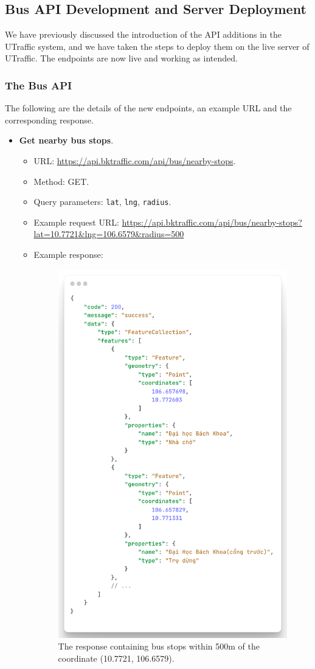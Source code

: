 \subsection{Bus API Development and Server Deployment}
We have previously discussed the introduction of the API additions in the UTraffic system, and we have taken the steps to deploy them on the live server of UTraffic. The endpoints are now live and working as intended.
\subsubsection{The Bus API}
The following are the details of the new endpoints, an example URL and the corresponding response.

\begin{itemize}
    \item \textbf{Get nearby bus stops}.
    \begin{itemize}
        \item URL: \url{https://api.bktraffic.com/api/bus/nearby-stops}.
        \item Method: GET.
        \item Query parameters: \lstinline{lat}, \lstinline{lng}, \lstinline{radius}.
        \item Example request URL: \url{https://api.bktraffic.com/api/bus/nearby-stops?lat=10.7721&lng=106.6579&radius=500}
        \item Example response: 
        \begin{figure}[H]
            \centering
            \includegraphics[width=0.4\linewidth]{assets/images/Implementation/nearby_bus_response.png}
            \caption{The response containing bus stops within 500m of the coordinate (10.7721, 106.6579).}
            \label{fig:nearby_stop_response}
        \end{figure}
    \end{itemize}


\end{itemize}
